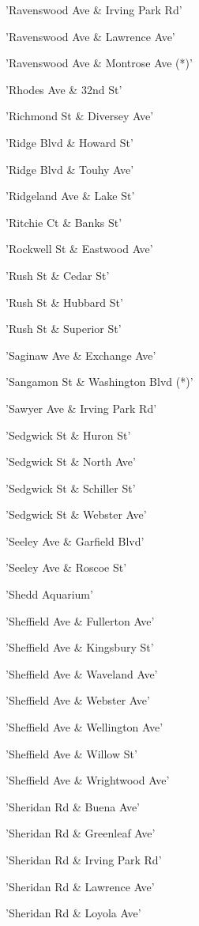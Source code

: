 \documentclass[11pt]{article}
\begin{document}
\begin{enumerate*}
\item 'Ravenswood Ave \& Irving Park Rd'
\item 'Ravenswood Ave \& Lawrence Ave'
\item 'Ravenswood Ave \& Montrose Ave (*)'
\item 'Rhodes Ave \& 32nd St'
\item 'Richmond St \& Diversey Ave'
\item 'Ridge Blvd \& Howard St'
\item 'Ridge Blvd \& Touhy Ave'
\item 'Ridgeland Ave \& Lake St'
\item 'Ritchie Ct \& Banks St'
\item 'Rockwell St \& Eastwood Ave'
\item 'Rush St \& Cedar St'
\item 'Rush St \& Hubbard St'
\item 'Rush St \& Superior St'
\item 'Saginaw Ave \& Exchange Ave'
\item 'Sangamon St \& Washington Blvd (*)'
\item 'Sawyer Ave \& Irving Park Rd'
\item 'Sedgwick St \& Huron St'
\item 'Sedgwick St \& North Ave'
\item 'Sedgwick St \& Schiller St'
\item 'Sedgwick St \& Webster Ave'
\item 'Seeley Ave \& Garfield Blvd'
\item 'Seeley Ave \& Roscoe St'
\item 'Shedd Aquarium'
\item 'Sheffield Ave \& Fullerton Ave'
\item 'Sheffield Ave \& Kingsbury St'
\item 'Sheffield Ave \& Waveland Ave'
\item 'Sheffield Ave \& Webster Ave'
\item 'Sheffield Ave \& Wellington Ave'
\item 'Sheffield Ave \& Willow St'
\item 'Sheffield Ave \& Wrightwood Ave'
\item 'Sheridan Rd \& Buena Ave'
\item 'Sheridan Rd \& Greenleaf Ave'
\item 'Sheridan Rd \& Irving Park Rd'
\item 'Sheridan Rd \& Lawrence Ave'
\item 'Sheridan Rd \& Loyola Ave'

\end{enumerate*}
\end{document}
